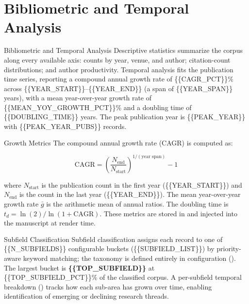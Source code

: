 \documentclass[
  ignorenonframetext,
]{beamer}
\author{}
\date{}
\begin{document}
\section{Bibliometric and Temporal
Analysis}\label{bibliometric-and-temporal-analysis}

\begin{frame}[allowframebreaks]{Bibliometric and Temporal Analysis}
Descriptive statistics summarize the corpus along every available axis:
counts by year, venue, and author; citation-count distributions; and
author productivity. Temporal analysis fits the publication time series,
reporting a compound annual growth rate of \{\{CAGR\_PCT\}\}\% across
\{\{YEAR\_START\}\}--\{\{YEAR\_END\}\} (a span of \{\{YEAR\_SPAN\}\}
years), with a mean year-over-year growth rate of
\{\{MEAN\_YOY\_GROWTH\_PCT\}\}\% and a doubling time of
\{\{DOUBLING\_TIME\}\} years. The peak publication year is
\{\{PEAK\_YEAR\}\} with \{\{PEAK\_YEAR\_PUBS\}\} records.
\end{frame}

\begin{frame}{Growth Metrics}
\label{growth-metrics}
The compound annual growth rate (CAGR) is computed as:

\[
\text{CAGR} = \left(\frac{N_{\text{end}}}{N_{\text{start}}}\right)^{1/(\text{year span})} - 1
\]

where \(N_{\text{start}}\) is the publication count in the first year
(\{\{YEAR\_START\}\}) and \(N_{\text{end}}\) is the count in the last
year (\{\{YEAR\_END\}\}). The mean year-over-year growth rate
\(\bar{g}\) is the arithmetic mean of annual ratios. The doubling time
is \(t_d = \ln(2) / \ln(1 + \text{CAGR})\). These metrics are stored in
 and injected into the manuscript at
render time.
\end{frame}

\begin{frame}{Subfield Classification}
\label{subfield-classification}
Subfield classification assigns each record to one of
\{\{N\_SUBFIELDS\}\} configurable buckets (\{\{SUBFIELD\_LIST\}\}) by
priority-aware keyword matching; the taxonomy is defined entirely in
configuration (). The largest
bucket is \textbf{\{\{TOP\_SUBFIELD\}\}} at \{\{TOP\_SUBFIELD\_PCT\}\}\%
of the classified corpus. A per-subfield temporal breakdown
() tracks how each sub-area has grown
over time, enabling identification of emerging or declining research
threads.
\end{frame}
\end{document}

